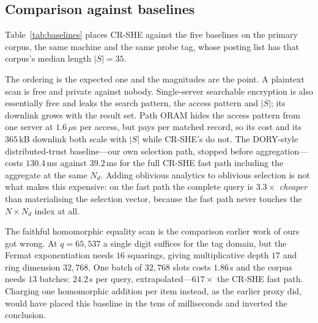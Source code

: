 \documentclass[journal]{IEEEtran}
\begin{document}
\subsection{Comparison against baselines}
Table~\ref{tab:baselines} places CR-SHE against the five baselines on the
primary corpus, the same machine and the same probe tag, whose posting list has
that corpus's median length $|S|=35$.

The ordering is the expected one and the magnitudes are the point. A plaintext
scan is free and private against nobody. Single-server searchable encryption is
also essentially free and leaks the search pattern, the access pattern and
$|S|$; its downlink grows with the result set. Path ORAM hides the access
pattern from one server at $1.6\,\mu$s per access, but pays per matched record,
so its cost and its $365$\,kB downlink both scale with $|S|$ while CR-SHE's do
not. The DORY-style distributed-trust baseline---our own selection path, stopped
before aggregation---costs $130.4$\,ms against $39.2$\,ms for the full CR-SHE
fast path including the aggregate at the same $N_d$. Adding oblivious analytics
to oblivious selection is not what makes this expensive: on the fast path the
complete query is $3.3\times$ \emph{cheaper} than materialising the selection
vector, because the fast path never touches the $N\times N_d$ index at all.

The faithful homomorphic equality scan is the comparison earlier work of ours
got wrong. At $q=65{,}537$ a single digit suffices for the tag domain, but the
Fermat exponentiation needs $16$ squarings, giving multiplicative depth $17$ and
ring dimension $32{,}768$. One batch of $32{,}768$ slots costs $1.86$\,s and the
corpus needs $13$ batches: $24.2$\,s per query, extrapolated---$617\times$ the
CR-SHE fast path. Charging one homomorphic addition per item instead, as the
earlier proxy did, would have placed this baseline in the tens of milliseconds
and inverted the conclusion.
\end{document}
